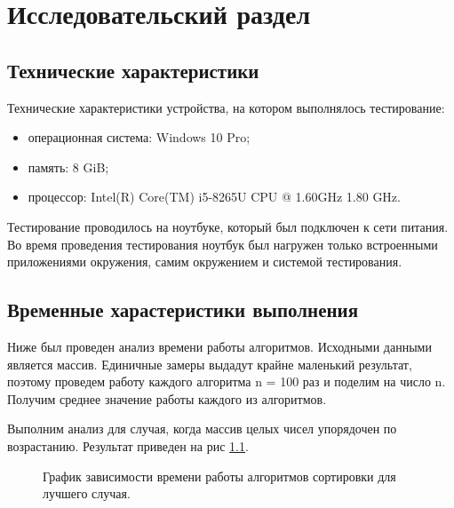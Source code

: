 \chapter{Исследовательский раздел}
\section{Технические характеристики}
Технические характеристики устройства, на котором выполнялось тестирование:
\begin{itemize}
	\item операционная система: Windows 10 Pro;
	\item память: 8 GiB;
	\item процессор: Intel(R) Core(TM) i5-8265U CPU @ 1.60GHz   1.80 GHz.
\end{itemize}
Тестирование проводилось на ноутбуке, который был подключен к сети питания. Во время проведения тестирования ноутбук был нагружен только встроенными приложениями окружения, самим окружением и системой тестирования.

\section{Временные харастеристики выполнения}
Ниже был проведен анализ времени работы алгоритмов. Исходными данными является массив. Единичные замеры выдадут крайне маленький результат, поэтому  проведем работу каждого алгоритма n = 100 раз и поделим на число n. Получим среднее значение работы каждого из алгоритмов. 

Выполним анализ для случая, когда массив целых чисел упорядочен по возрастанию. Результат приведен на рис \ref{fg:ref1}.

\begin{figure}[H]
	\centering
	\caption{График зависимости времени работы алгоритмов сортировки для лучшего случая.} 
	\label{fg:ref1}
\end{figure} 

